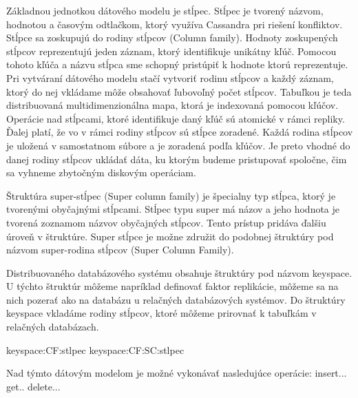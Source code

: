\documentclass[11pt,twoside,a4paper]{book}
\begin{document}
Základnou jednotkou dátového modelu je stĺpec. Stĺpec je tvorený názvom, hodnotou a časovým odtlačkom, ktorý využíva Cassandra pri riešení konfliktov. Stĺpce sa zoskupujú do rodiny stĺpcov (Column family). Hodnoty zoskupených stĺpcov reprezentujú jeden záznam, ktorý identifikuje unikátny kľúč. Pomocou tohoto kľúča a názvu stĺpca sme schopný pristúpiť k hodnote ktorú reprezentuje. Pri vytváraní dátového modelu stačí vytvoriť rodinu stĺpcov a každý záznam, ktorý do nej vkládame môže obsahovať ľubovoľný počet stĺpcov. Tabuľkou je teda distribuovaná multidimenzionálna mapa, ktorá je indexovaná pomocou kľúčov. Operácie nad stĺpcami, ktoré identifikuje daný kľúč sú atomické v rámci repliky. Ďalej platí, že vo v rámci rodiny stĺpcov sú stĺpce zoradené. Každá rodina stĺpcov je uložená v samostatnom súbore a je zoradená podľa kľúčov. Je preto vhodné do danej rodiny stĺpcov ukládať dáta, ku ktorým budeme pristupovať spoločne, čim sa vyhneme zbytočným diskovým operáciam.

Štruktúra super-stĺpec (Super column family) je špecialny typ stĺpca, ktorý je tvorenými obyčajnými stĺpcami. Stĺpec typu super má názov a jeho hodnota je tvorená zoznamom názvov obyčajných stĺpcov. Tento prístup pridáva ďalšiu úroveň v štruktúre. Super stĺpce je možne združit do podobnej štruktúry pod názvom super-rodina stĺpcov (Super Column Family).

Distribuovaného databázového systému obsahuje štruktúry pod názvom keyspace. U týchto štruktúr môžeme napríklad definovať faktor replikácie, môžeme sa na nich pozerať ako na databázu u relačných databázových systémov. Do štruktúry keyspace vkladáme rodiny stĺpcov, ktoré môžeme prirovnať k tabuľkám v relačných databázach. 


keyspace:CF:stlpec
keyspace:CF:SC:stlpec

Nad týmto dátovým modelom je možné vykonávať nasledujúce operácie:
insert...
get..
delete...
\end{document}
